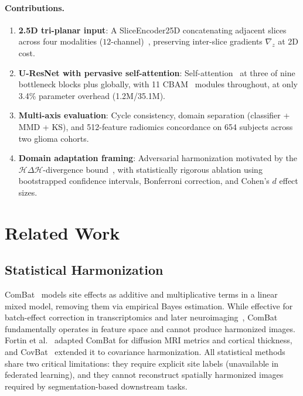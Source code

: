 \documentclass{article}
\begin{document}
\paragraph{Contributions.}
\begin{enumerate}
  \item \textbf{2.5D tri-planar input}: A SliceEncoder25D concatenating adjacent slices
        across four modalities ($12$-channel)~\cite{roth2014twopointfived},
        preserving inter-slice gradients $\nabla_z$ at 2D cost.
  \item \textbf{U-ResNet with pervasive self-attention}: Self-attention~\cite{zhang2019sagan}
        at three of nine bottleneck blocks plus globally, with 11 CBAM~\cite{woo2018cbam}
        modules throughout, at only 3.4\% parameter overhead (1.2M/35.1M).
  \item \textbf{Multi-axis evaluation}: Cycle consistency, domain separation (classifier +
        MMD + KS), and 512-feature radiomics concordance on 654 subjects across two glioma
        cohorts.
  \item \textbf{Domain adaptation framing}: Adversarial harmonization motivated by the
        $\mathcal{H}\Delta\mathcal{H}$-divergence bound~\cite{ben2010theory}, with
        statistically rigorous ablation using bootstrapped confidence intervals, Bonferroni
        correction, and Cohen's $d$ effect sizes.
\end{enumerate}

\section{Related Work}
\label{sec:related}

\subsection{Statistical Harmonization}

ComBat~\cite{johnson2007combat} models site effects as additive and multiplicative terms
in a linear mixed model, removing them via empirical Bayes estimation. While effective
for batch-effect correction in transcriptomics and later neuroimaging~\cite{fortin2017harmonization},
ComBat fundamentally operates in feature space and cannot produce harmonized images.
Fortin et al.~\cite{fortin2017harmonization} adapted ComBat for diffusion MRI metrics and
cortical thickness, and CovBat~\cite{chen2022covbat} extended it to covariance
harmonization. All statistical methods share
two critical limitations: they require explicit site labels (unavailable in federated
learning), and they cannot reconstruct spatially harmonized images required by
segmentation-based downstream tasks.
\end{document}

